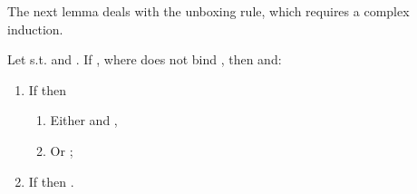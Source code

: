 \documentclass{LMCS}
\renewcommand{\>}{\rightarrow}
\begin{document}
The next lemma deals with the unboxing rule, which requires a complex induction.

\begin{lem}
\label{l:lauxmes-red-unb2}
Let  s.t.    and 
. If , 
where  does not bind ,  then  and: 
\begin{enumerate}[]
  \item If  then 
  \begin{enumerate}[]
  \item Either  and ,
  \item Or ;
  \end{enumerate}
  
  \item If  then
  .
\end{enumerate}
\end{lem}
\end{document}
